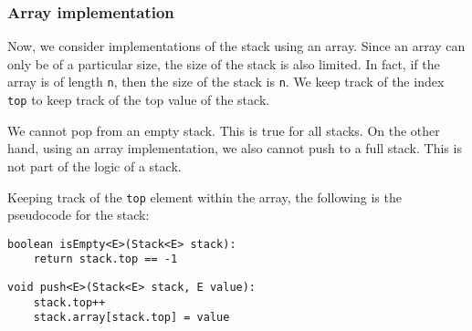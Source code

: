 \documentclass[a4paper, openany]{memoir}
\begin{document}
\subsubsection{Array implementation}
Now, we consider implementations of the stack using an array. Since an array can only be of a particular size, the size of the stack is also limited. In fact, if the array is of length \texttt{n}, then the size of the stack is \texttt{n}. We keep track of the index \texttt{top} to keep track of the top value of the stack.

\noindent We cannot pop from an empty stack. This is true for all stacks. On the other hand, using an array implementation, we also cannot push to a full stack. This is not part of the logic of a stack. 

\noindent Keeping track of the \texttt{top} element within the array, the following is the pseudocode for the stack:
\begin{lstlisting}[language=pseudocode]
boolean isEmpty<E>(Stack<E> stack):
    return stack.top == -1
\end{lstlisting}

\begin{lstlisting}[language=pseudocode]
void push<E>(Stack<E> stack, E value):
    stack.top++
    stack.array[stack.top] = value
\end{lstlisting}
\end{document}
